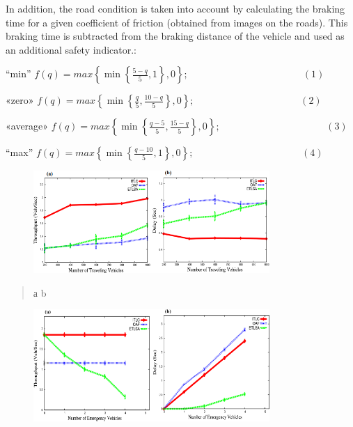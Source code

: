 In addition, the road condition is taken into account by calculating the
braking time for a given coefficient of friction (obtained from images
on the roads). This braking time is subtracted from the braking distance
of the vehicle and used as an additional safety indicator.:

``min''
\(f(q) = max\left\{ \min\left\{ \frac{5 - q}{5},1 \right\},0 \right\};\ \ \ \ \ \ \ \ \ \ \ \ \ \ \ \ \ \ \ \ \ \ \ \ \ \ \ \ \ \ \ \ \ \ \ \ \ \ \ \ \ \ \ \ \ \ \ \ \ \ \ \ \ (1)\)

«zero»
\(f(q) = max\left\{ \min\left\{ \frac{q}{5},\frac{10 - q}{5} \right\},0 \right\};\ \ \ \ \ \ \ \ \ \ \ \ \ \ \ \ \ \ \ \ \ \ \ \ \ \ \ \ \ \ \ \ \ \ \ \ \ \ \ \ \ \ \ \ \ \ \ \ \ (2)\)

«average»
\(f(q) = max\left\{ \min\left\{ \frac{q - 5}{5},\frac{15 - q}{5} \right\},0 \right\};\ \ \ \ \ \ \ \ \ \ \ \ \ \ \ \ \ \ \ \ \ \ \ \ \ \ \ \ \ \ \ \ \ \ \ \ \ \ \ \ \ \ \ \ \ \ \ \ \ (3)\)

``max''
\(f(q) = max\left\{ \min\left\{ \frac{q - 10}{5},1 \right\},0 \right\};\ \ \ \ \ \ \ \ \ \ \ \ \ \ \ \ \ \ \ \ \ \ \ \ \ \ \ \ \ \ \ \ \ \ \ \ \ \ \ \ \ \ \ \ \ \ \ \ \ \ (4)\)

\begin{figure}[H]
	\centering
	\includegraphics[width=0.8\textwidth]{assets/75}
	\caption*{}
\end{figure}

\begin{quote}
а b
\end{quote}

\begin{figure}[H]
	\centering
	\includegraphics[width=0.8\textwidth]{assets/76}
	\caption*{}
\end{figure}

